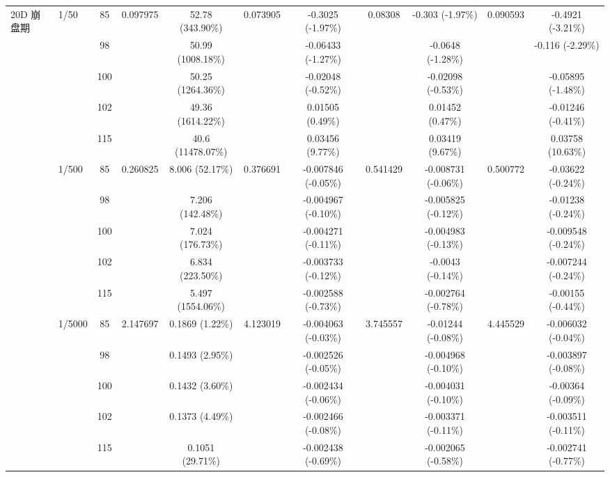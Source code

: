 \begin{table}[htbp]
{\begin{tabular}{llccccccccc}
\multirow{15}{*}{20D 崩盘期}
& \multirow{5}{*}{1/50} & 85 & \multirow{5}{*}{0.097975} & 52.78 (343.90\%) & \multirow{5}{*}{0.073905} & -0.3025 (-1.97\%) & \multirow{5}{*}{0.08308} & -0.303 (-1.97\%) & \multirow{5}{*}{0.090593} & -0.4921 (-3.21\%) \\
& & 98 & & 50.99 (1008.18\%) & & -0.06433 (-1.27\%) & & -0.0648 (-1.28\%) & & -0.116 (-2.29\%) \\
& & 100 & & 50.25 (1264.36\%) & & -0.02048 (-0.52\%) & & -0.02098 (-0.53\%) & & -0.05895 (-1.48\%) \\
& & 102 & & 49.36 (1614.22\%) & & 0.01505 (0.49\%) & & 0.01452 (0.47\%) & & -0.01246 (-0.41\%) \\
& & 115 & & 40.6 (11478.07\%) & & 0.03456 (9.77\%) & & 0.03419 (9.67\%) & & 0.03758 (10.63\%) \\
\cmidrule(lr){2-11}
& \multirow{5}{*}{1/500} & 85 & \multirow{5}{*}{0.260825} & 8.006 (52.17\%) & \multirow{5}{*}{0.376691} & -0.007846 (-0.05\%) & \multirow{5}{*}{0.541429} & -0.008731 (-0.06\%) & \multirow{5}{*}{0.500772} & -0.03622 (-0.24\%) \\
& & 98 & & 7.206 (142.48\%) & & -0.004967 (-0.10\%) & & -0.005825 (-0.12\%) & & -0.01238 (-0.24\%) \\
& & 100 & & 7.024 (176.73\%) & & -0.004271 (-0.11\%) & & -0.004983 (-0.13\%) & & -0.009548 (-0.24\%) \\
& & 102 & & 6.834 (223.50\%) & & -0.003733 (-0.12\%) & & -0.0043 (-0.14\%) & & -0.007244 (-0.24\%) \\
& & 115 & & 5.497 (1554.06\%) & & -0.002588 (-0.73\%) & & -0.002764 (-0.78\%) & & -0.00155 (-0.44\%) \\
\cmidrule(lr){2-11}
& \multirow{5}{*}{1/5000} & 85 & \multirow{5}{*}{2.147697} & 0.1869 (1.22\%) & \multirow{5}{*}{4.123019} & -0.004063 (-0.03\%) & \multirow{5}{*}{3.745557} & -0.01244 (-0.08\%) & \multirow{5}{*}{4.445529} & -0.006032 (-0.04\%) \\
& & 98 & & 0.1493 (2.95\%) & & -0.002526 (-0.05\%) & & -0.004968 (-0.10\%) & & -0.003897 (-0.08\%) \\
& & 100 & & 0.1432 (3.60\%) & & -0.002434 (-0.06\%) & & -0.004031 (-0.10\%) & & -0.00364 (-0.09\%) \\
& & 102 & & 0.1373 (4.49\%) & & -0.002466 (-0.08\%) & & -0.003371 (-0.11\%) & & -0.003511 (-0.11\%) \\
& & 115 & & 0.1051 (29.71\%) & & -0.002438 (-0.69\%) & & -0.002065 (-0.58\%) & & -0.002741 (-0.77\%) \\
\midrule


\end{tabular}}
\end{table}

